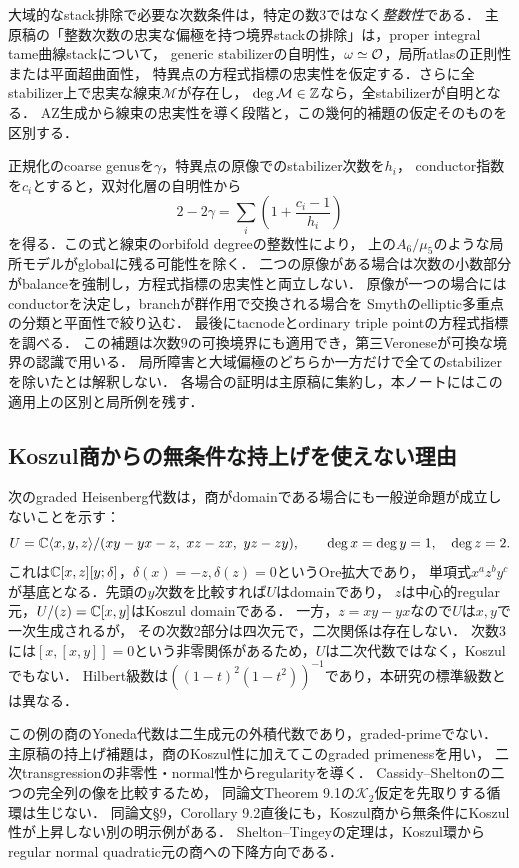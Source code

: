 \documentclass[11pt,a4paper]{ltjsarticle}
\begin{document}
大域的なstack排除で必要な次数条件は，特定の数$3$ではなく\emph{整数性}である．
主原稿の「整数次数の忠実な偏極を持つ境界stackの排除」は，proper integral tame曲線stackについて，
generic stabilizerの自明性，$\omega\simeq\mathcal O$，局所atlasの正則性または平面超曲面性，
特異点の方程式指標の忠実性を仮定する．さらに全stabilizer上で忠実な線束$\mathcal M$が存在し，
$\deg\mathcal M\in\mathbb Z$なら，全stabilizerが自明となる．
AZ生成から線束の忠実性を導く段階と，この幾何的補題の仮定そのものを区別する．

正規化のcoarse genusを$\gamma$，特異点の原像でのstabilizer次数を$h_i$，
conductor指数を$c_i$とすると，双対化層の自明性から
\[
 2-2\gamma=\sum_i\left(1+\frac{c_i-1}{h_i}\right)
\]
を得る．この式と線束のorbifold degreeの整数性により，
上の$A_6/\mu_5$のような局所モデルがglobalに残る可能性を除く．
二つの原像がある場合は次数の小数部分がbalanceを強制し，方程式指標の忠実性と両立しない．
原像が一つの場合にはconductorを決定し，branchが群作用で交換される場合を
Smyth\cite[Proposition A.3]{SmythGenusOne}のelliptic多重点の分類と平面性で絞り込む．
最後にtacnodeとordinary triple pointの方程式指標を調べる．
この補題は次数$9$の可換境界にも適用でき，第三Veroneseが可換な境界の認識で用いる．
局所障害と大域偏極のどちらか一方だけで全てのstabilizerを除いたとは解釈しない．
各場合の証明は主原稿に集約し，本ノートにはこの適用上の区別と局所例を残す．

\subsection{Koszul商からの無条件な持上げを使えない理由}
次のgraded Heisenberg代数は，商がdomainである場合にも一般逆命題が成立しないことを示す：
\[
 U=\mathbb C\langle x,y,z\rangle/
 (xy-yx-z,\ xz-zx,\ yz-zy),\qquad
 \deg x=\deg y=1,\quad\deg z=2.
\]
これは$\mathbb C[x,z][y;\delta]$，$\delta(x)=-z,\delta(z)=0$というOre拡大であり，
単項式$x^az^by^c$が基底となる．先頭の$y$次数を比較すれば$U$はdomainであり，
$z$は中心的regular元，$U/(z)=\mathbb C[x,y]$はKoszul domainである．
一方，$z=xy-yx$なので$U$は$x,y$で一次生成されるが，
その次数2部分は四次元で，二次関係は存在しない．
次数3には$[x,[x,y]]=0$という非零関係があるため，$U$は二次代数ではなく，Koszulでもない．
Hilbert級数は$((1-t)^2(1-t^2))^{-1}$であり，本研究の標準級数とは異なる．

この例の商のYoneda代数は二生成元の外積代数であり，graded-primeでない．
主原稿の持上げ補題は，商のKoszul性に加えてこのgraded primenessを用い，
二次transgressionの非零性・normal性からregularityを導く．
Cassidy--Shelton\cite[\S6, (6.1)--(6.2)]{CassidyShelton}の二つの完全列の像を比較するため，
同論文Theorem 9.1の$\mathcal K_2$仮定を先取りする循環は生じない．
同論文\S9，Corollary 9.2直後にも，Koszul商から無条件にKoszul性が上昇しない別の明示例がある．
Shelton--Tingey\cite{SheltonTingey}の定理は，Koszul環からregular normal quadratic元の商への下降方向である．
\end{document}
